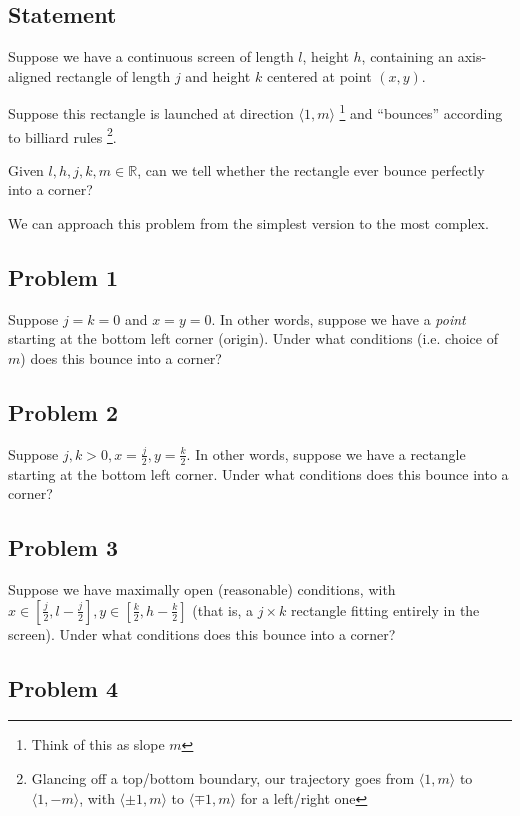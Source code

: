 \documentclass[11pt, oneside]{article} 	%
\begin{document}
\subsection{Statement} 
Suppose we have a continuous screen of length $l$, height $h$, containing an axis-aligned rectangle of length $j$ and height $k$ centered at point $(x, y)$.

Suppose this rectangle is launched at direction $\langle 1, m\rangle$ \footnote {Think of this as slope $m$} and ``bounces'' according to billiard rules \footnote{Glancing off a top/bottom boundary, our trajectory goes from $\langle 1, m \rangle$ to $\langle 1, -m \rangle$, with $\langle \pm 1, m \rangle$ to $\langle \mp 1, m \rangle$ for a left/right one}.

Given $l, h, j, k, m \in \mathbb{R}$, can we tell whether the rectangle ever bounce perfectly into a corner?  

We can approach this problem from the simplest version to the most complex.

\subsection{Problem 1} 

Suppose $j = k = 0$ and $x = y = 0$. In other words, suppose we have a \emph{point} starting at the bottom left corner
 (origin). Under what conditions (i.e. choice of $m$) does this bounce into a corner?


\subsection{Problem 2} 

Suppose $j, k > 0, x = \frac{j}{2}, y = \frac{k}{2}$. In other words, suppose we have a rectangle starting at the bottom left corner. Under what conditions does this bounce into a corner?

\subsection{Problem 3} 

Suppose we have maximally open (reasonable) conditions, with $x \in [\frac{j}{2}, l - \frac{j}{2}], y \in [\frac{k}{2}, h - \frac{k}{2}]$ (that is, a $j \times k$ rectangle fitting entirely in the screen). Under what conditions does this bounce into a corner?


\subsection{Problem 4} 
\end{document}
